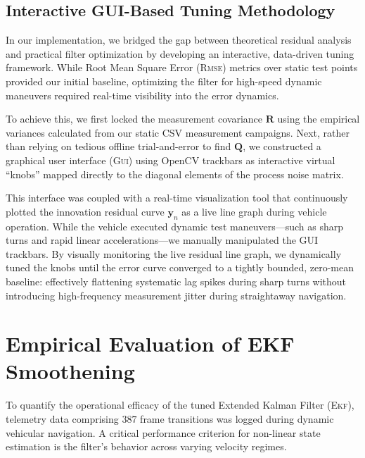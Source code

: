 \subsection{Interactive GUI-Based Tuning Methodology}

In our implementation, we bridged the gap between theoretical residual analysis and practical filter optimization by developing an interactive, data-driven tuning framework. While Root Mean Square Error (\textsc{Rmse}) metrics over static test points provided our initial baseline, optimizing the filter for high-speed dynamic maneuvers required real-time visibility into the error dynamics.

To achieve this, we first locked the measurement covariance $\mathbf{R}$ using the empirical variances calculated from our static CSV measurement campaigns. Next, rather than relying on tedious offline trial-and-error to find $\mathbf{Q}$, we constructed a graphical user interface (\textsc{Gui}) using OpenCV trackbars as interactive virtual \enquote{knobs} mapped directly to the diagonal elements of the process noise matrix.

This interface was coupled with a real-time visualization tool that continuously plotted the innovation residual curve $\mathbf{y}_n$ as a live line graph during vehicle operation.%
While the vehicle executed dynamic test maneuvers—such as sharp turns and rapid linear accelerations—we manually manipulated the GUI trackbars. By visually monitoring the live residual line graph, we dynamically tuned the knobs until the error curve converged to a tightly bounded, zero-mean baseline: effectively flattening systematic lag spikes during sharp turns without introducing high-frequency measurement jitter during straightaway navigation.

\section{Empirical Evaluation of EKF Smoothening}
\label{sec:ekf_evaluation}

To quantify the operational efficacy of the tuned Extended Kalman Filter (\textsc{Ekf}), telemetry data comprising $387$ frame transitions was logged during dynamic vehicular navigation. A critical performance criterion for non-linear state estimation is the filter's behavior across varying velocity regimes.%

